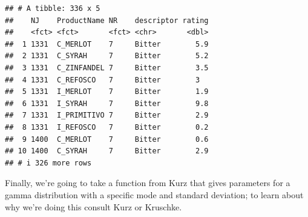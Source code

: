 \documentclass[
]{book}
\newenvironment{Shaded}{\begin{snugshade}}{\end{snugshade}}
\newcommand{\CommentTok}[1]{\textcolor[rgb]{0.56,0.35,0.01}{\textit{#1}}}
\newcommand{\FunctionTok}[1]{\textcolor[rgb]{0.13,0.29,0.53}{\textbf{#1}}}
\newcommand{\NormalTok}[1]{#1}
\newcommand{\OtherTok}[1]{\textcolor[rgb]{0.56,0.35,0.01}{#1}}
\newcommand{\SpecialCharTok}[1]{\textcolor[rgb]{0.81,0.36,0.00}{\textbf{#1}}}
\begin{document}
\begin{verbatim}
## # A tibble: 336 x 5
##    NJ    ProductName NR    descriptor rating
##    <fct> <fct>       <fct> <chr>       <dbl>
##  1 1331  C_MERLOT    7     Bitter        5.9
##  2 1331  C_SYRAH     7     Bitter        5.2
##  3 1331  C_ZINFANDEL 7     Bitter        3.5
##  4 1331  C_REFOSCO   7     Bitter        3  
##  5 1331  I_MERLOT    7     Bitter        1.9
##  6 1331  I_SYRAH     7     Bitter        9.8
##  7 1331  I_PRIMITIVO 7     Bitter        2.9
##  8 1331  I_REFOSCO   7     Bitter        0.2
##  9 1400  C_MERLOT    7     Bitter        0.6
## 10 1400  C_SYRAH     7     Bitter        2.9
## # i 326 more rows
\end{verbatim}

\begin{Shaded}
\end{Shaded}

Finally, we're going to take a function from Kurz that gives parameters for a gamma distribution with a specific mode and standard deviation; to learn about why we're doing this consult Kurz or Kruschke.
\end{document}
